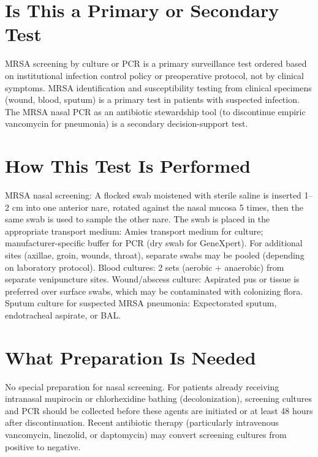 \section*{Is This a Primary or Secondary Test}
MRSA screening by culture or PCR is a primary surveillance test ordered based on institutional infection control policy or preoperative protocol, not by clinical symptoms. MRSA identification and susceptibility testing from clinical specimens (wound, blood, sputum) is a primary test in patients with suspected infection. The MRSA nasal PCR as an antibiotic stewardship tool (to discontinue empiric vancomycin for pneumonia) is a secondary decision-support test.

\section*{How This Test Is Performed}
MRSA nasal screening: A flocked swab moistened with sterile saline is inserted 1--2 cm into one anterior nare, rotated against the nasal mucosa 5 times, then the same swab is used to sample the other nare. The swab is placed in the appropriate transport medium: Amies transport medium for culture; manufacturer-specific buffer for PCR (dry swab for GeneXpert). For additional sites (axillae, groin, wounds, throat), separate swabs may be pooled (depending on laboratory protocol). Blood cultures: 2 sets (aerobic + anaerobic) from separate venipuncture sites. Wound/abscess culture: Aspirated pus or tissue is preferred over surface swabs, which may be contaminated with colonizing flora. Sputum culture for suspected MRSA pneumonia: Expectorated sputum, endotracheal aspirate, or BAL.

\section*{What Preparation Is Needed}
No special preparation for nasal screening. For patients already receiving intranasal mupirocin or chlorhexidine bathing (decolonization), screening cultures and PCR should be collected before these agents are initiated or at least 48 hours after discontinuation. Recent antibiotic therapy (particularly intravenous vancomycin, linezolid, or daptomycin) may convert screening cultures from positive to negative.

